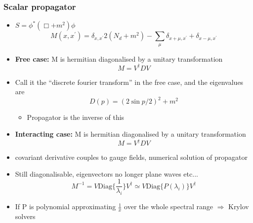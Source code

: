 \documentclass[pdf,ps,8pt]{beamer}
\begin{document}
\begin{frame}[fragile]\small\frametitle{Scalar propagator}

  \begin{itemize}
  \item $S = \phi^\ast (\Box  + m^2) \phi $
    $$
      M(x,x^\prime) = \delta_{x,x^\prime} 2( N_d+m^2 ) - \sum\limits_\mu \delta_{x+\mu,x^\prime}+\delta_{x-\mu,x^\prime}
        $$
      \item {\bf Free case:} M is hermitian diagonalised by a unitary transformation
        $$
        M = V^\dagger D V
        $$
      \item Call it the ``discrete fourier transform'' in the free case, and the eigenvalues are
        $$
        D(p) = (2 \sin p/2)^2 + m^2
        $$
  \begin{itemize}
      \item Propagator is the inverse of this
  \end{itemize}
      \item {\bf Interacting case:} M is hermitian diagonalised by a unitary transformation
        $$
        M = V^\dagger D V
        $$
      \item covariant derivative couples to gauge fields, numerical solution of propagator
      \item Still diagonalisable, eigenvectors no longer plane waves etc...
$$M^{-1} = V \mathrm{Diag}\{ \frac{1}{\lambda_i} \} V^\dag \simeq  V \mathrm{Diag}\{ P(\lambda_i) \} V^\dag  $$
      \item If P is polynomial approximating $\frac{1}{x}$ over the whole spectral range $\Rightarrow$ Krylov solvers
  \end{itemize}
 \end{frame}
\end{document}
